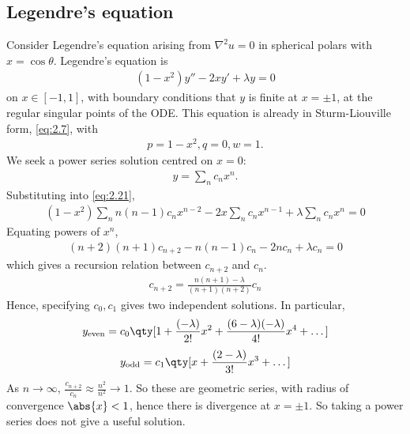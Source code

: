 \subsection{Legendre's equation}
Consider Legendre's equation arising from $\nabla^2 u = 0$ in spherical polars with $x = \cos\theta$.
Legendre's equation is
\begin{align}
    (1-x^2)y'' - 2xy' + \lambda y = 0 \label{eq:2.21}
\end{align}
on $x \in [-1,1]$, with boundary conditions that $y$ is finite at $x = \pm 1$, at the regular singular points of the ODE.
This equation is already in Sturm-Liouville form, \cref{eq:2.7}, with
\begin{align*}
    p=1-x^2, q=0, w=1.
\end{align*}
We seek a power series solution centred on $x = 0$:
\begin{align*}
    y = \sum_n c_n x^n.
\end{align*}
Substituting into \cref{eq:2.21},
\begin{align*}
    (1-x^2) \sum_n n(n-1) c_n x^{n-2} - 2x \sum_n c_n x^{n-1} + \lambda \sum_n c_n x^n = 0
\end{align*}
Equating powers of $x^n$,
\begin{align*}
    (n+2)(n+1)c_{n+2} - n(n-1)c_n - 2n c_n + \lambda c_n = 0
\end{align*}
which gives a recursion relation between $c_{n+2}$ and $c_n$.
\begin{align} \label{eq:2.22}
    c_{n+2} = \frac{n(n+1) - \lambda}{(n+1)(n+2)} c_n
\end{align}
Hence, specifying $c_0, c_1$ gives two independent solutions.
In particular,
\begin{align*}
    y_{\text{even}} = c_0 \qty[1 + \frac{(-\lambda)}{2!}x^2 + \frac{(6-\lambda)(-\lambda)}{4!} x^4 + \dots]
\end{align*}
\begin{align*}
    y_{\text{odd}} = c_1 \qty[x + \frac{(2-\lambda)}{3!}x^3 + \dots]
\end{align*}
As $n \to \infty$, $\frac{c_{n+2}}{c_n} \approx \frac{n^2}{n^2} \to 1$.
So these are geometric series, with radius of convergence $\abs{x} < 1$, hence there is divergence at $x = \pm 1$.
So taking a power series does not give a useful solution.

